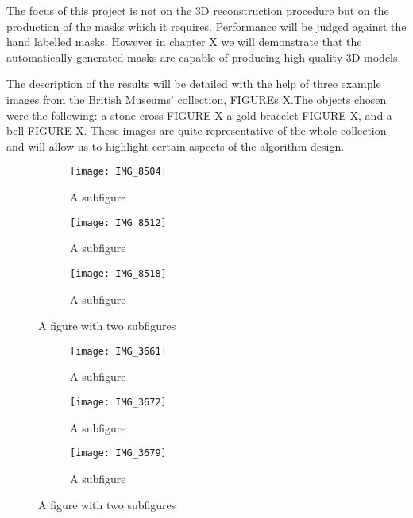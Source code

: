 \documentclass[12pt]{IIBproject}
\begin{document}
The focus of this project is not on the 3D reconstruction procedure but on the production of the masks which it requires. Performance will be judged against the hand labelled masks. However in chapter X we will demonstrate that the automatically generated masks are capable of producing high quality 3D models.

The description of the results will be detailed with the help of three example images from the British Museums' collection, FIGUREs X.The objects chosen were the following: a stone cross FIGURE X a gold bracelet FIGURE X, and a bell FIGURE X. These images are quite representative of the whole collection and will allow us to highlight certain aspects of the algorithm design. 
\begin{figure}[H]
\centering
\begin{subfigure}{.33\textwidth}
  \centering
  \texttt{[image: IMG\_8504]}
  \caption{A subfigure}
  \label{fig:sub1}
\end{subfigure}%
\begin{subfigure}{.33\textwidth}
  \centering
  \texttt{[image: IMG\_8512]}
  \caption{A subfigure}
  \label{fig:sub2}
\end{subfigure}
\begin{subfigure}{.33\textwidth}
  \centering
  \texttt{[image: IMG\_8518]}
  \caption{A subfigure}
  \label{fig:sub2}
\end{subfigure}
\caption{A figure with two subfigures}
\label{fig:test}
\end{figure}

\begin{figure}[H]
\centering
\begin{subfigure}{.33\textwidth}
  \centering
  \texttt{[image: IMG\_3661]}
  \caption{A subfigure}
  \label{fig:sub1}
\end{subfigure}%
\begin{subfigure}{.33\textwidth}
  \centering
  \texttt{[image: IMG\_3672]}
  \caption{A subfigure}
  \label{fig:sub2}
\end{subfigure}
\begin{subfigure}{.33\textwidth}
  \centering
  \texttt{[image: IMG\_3679]}
  \caption{A subfigure}
  \label{fig:sub2}
\end{subfigure}
\caption{A figure with two subfigures}
\label{fig:test}
\end{figure}
\end{document}

